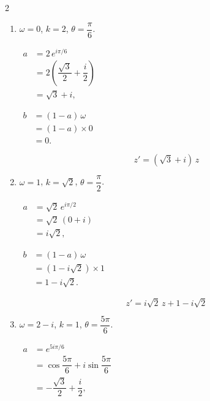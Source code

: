 \documentclass[12pt,a4paper]{article}
\begin{document}
\begin{multicols}{2}
\setlength{\columnseprule}{0.1mm} %

\begin{enumerate}

    \item $\omega = 0$, $k=2$, $\theta=\dfrac{\pi}{6}$.

    $
    \begin{aligned}
    a &= 2\,e^{i\pi/6} \\[1mm]
      &= 2\left(\dfrac{\sqrt3}{2}+\dfrac{i}{2}\right) \\[1mm]
      &= \sqrt3 + i,
    \end{aligned}
    $

    $
    \begin{aligned}
    b &= (1-a)\,\omega \\[1mm]
      &= (1-a)\times 0 \\[1mm]
      &= 0.
    \end{aligned}
    $

    \[
    \boxed{z' = (\sqrt3 + i)\,z}
    \]

    \item $\omega = 1$, $k=\sqrt2$, $\theta=\dfrac{\pi}{2}$.

    $
    \begin{aligned}
    a &= \sqrt2\,e^{i\pi/2} \\[1mm]
      &= \sqrt2\,(0 + i) \\[1mm]
      &= i\sqrt2,
    \end{aligned}
    $

    $
    \begin{aligned}
    b &= (1-a)\,\omega \\[1mm]
      &= \left(1 - i\sqrt2\right)\times 1 \\[1mm]
      &= 1 - i\sqrt2.
    \end{aligned}
    $

    \[
    \boxed{z' = i\sqrt2\,z + 1 - i\sqrt2}
    \]

    \item $\omega = 2 - i$, $k=1$, $\theta=\dfrac{5\pi}{6}$.

    $
    \begin{aligned}
    a &= e^{5i\pi/6} \\[1mm]
      &= \cos\dfrac{5\pi}{6} + i\sin\dfrac{5\pi}{6} \\[1mm]
      &= -\dfrac{\sqrt3}{2}+\dfrac{i}{2},
    \end{aligned}
    $


\end{enumerate}
\end{multicols}
\end{document}
